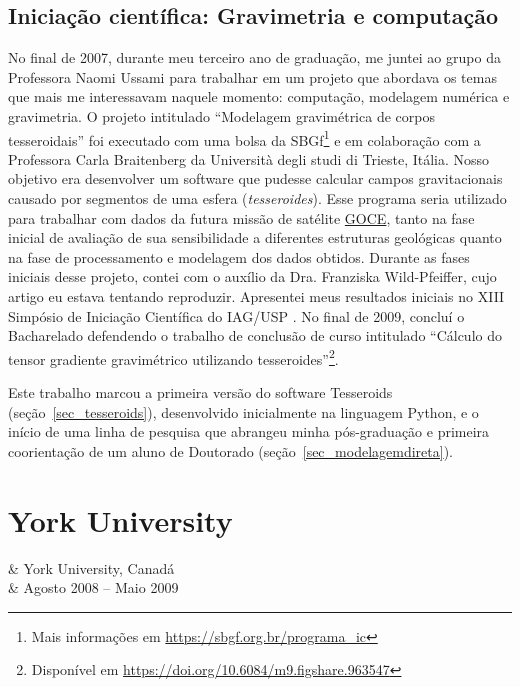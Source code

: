 \documentclass[12pt,a4paper,oneside]{book}
\newcommand{\Trieste}{Università degli studi di Trieste}
\begin{document}
\subsection{Iniciação científica: Gravimetria e computação}
\label{sec_ic_tesseroids}

No final de 2007, durante meu terceiro ano de graduação, me juntei ao grupo da
Professora Naomi Ussami para trabalhar em um projeto que abordava os temas que
mais me interessavam naquele momento: computação, modelagem numérica e
gravimetria.
O projeto intitulado ``Modelagem gravimétrica de corpos tesseroidais'' foi
executado com uma bolsa da
SBGf\footnote{Mais informações em \url{https://sbgf.org.br/programa_ic}}
e em colaboração com a Professora Carla Braitenberg da \Trieste{}, Itália.
Nosso objetivo era desenvolver um software que pudesse calcular campos
gravitacionais causado por segmentos de uma esfera (\textit{tesseroides}).
Esse programa seria utilizado para trabalhar com dados da futura missão de
satélite \href{https://www.esa.int/Enabling_Support/Operations/GOCE}{GOCE},
tanto na fase inicial de avaliação de sua sensibilidade a diferentes estruturas
geológicas quanto na fase de processamento e modelagem dos dados obtidos.
Durante as fases iniciais desse projeto, contei com o auxílio da Dra.
Franziska Wild-Pfeiffer, cujo artigo \citep{WildPfeiffer2008} eu estava
tentando reproduzir.
Apresentei meus resultados iniciais no XIII Simpósio de Iniciação Científica do
IAG/USP \citep{Uieda2008}.
No final de 2009, concluí o Bacharelado defendendo o trabalho de conclusão de
curso intitulado ``Cálculo do tensor gradiente gravimétrico utilizando
tesseroides''\footnote{Disponível em \url{https://doi.org/10.6084/m9.figshare.963547}}.

Este trabalho marcou a primeira versão do software Tesseroids
(seção~\ref{sec_tesseroids}), desenvolvido inicialmente na linguagem Python,
e o início de uma linha de pesquisa que abrangeu minha pós-graduação e primeira
coorientação de um aluno de Doutorado (seção~\ref{sec_modelagemdireta}).

\section{York University}
\label{sec_york}

\begin{subsummarybox}[frametitle=\faPlane{}\quad Intercâmbio internacional]
  \begin{fa-ul}
    \faUniversity & York University, Canadá\\
    \faCalendar & Agosto 2008 -- Maio 2009
  \end{fa-ul}
\end{subsummarybox}
\end{document}

